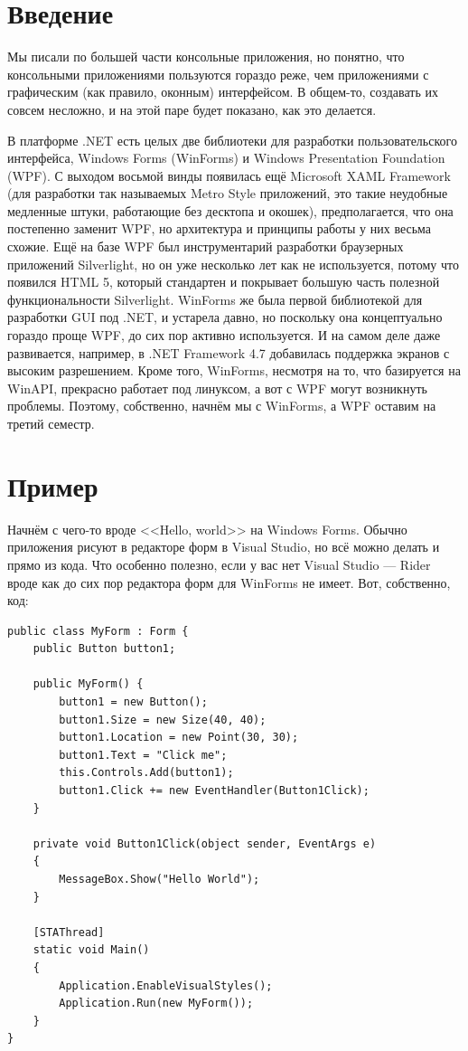 \documentclass{../../text-style}
\begin{document}
\maketitle
\thispagestyle{empty}

\section{Введение}

Мы писали по большей части консольные приложения, но понятно, что консольными приложениями пользуются гораздо реже, чем приложениями с графическим (как правило, оконным) интерфейсом. В общем-то, создавать их совсем несложно, и на этой паре будет показано, как это делается. 

В платформе .NET есть целых две библиотеки для разработки пользовательского интерфейса, Windows Forms (WinForms) и Windows Presentation Foundation (WPF). С выходом восьмой винды появилась ещё Microsoft XAML Framework (для разработки так называемых Metro Style приложений, это такие неудобные медленные штуки, работающие без десктопа и окошек), предполагается, что она постепенно заменит WPF, но архитектура и принципы работы у них весьма схожие. Ещё на базе WPF был инструментарий разработки браузерных приложений Silverlight, но он уже несколько лет как не используется, потому что появился HTML 5, который стандартен и покрывает большую часть полезной функциональности Silverlight. WinForms же была первой библиотекой для разработки GUI под .NET, и устарела давно, но поскольку она концептуально гораздо проще WPF, до сих пор активно используется. И на самом деле даже развивается, например, в .NET Framework 4.7 добавилась поддержка экранов с высоким разрешением. Кроме того, WinForms, несмотря на то, что базируется на WinAPI, прекрасно работает под линуксом, а вот с WPF могут возникнуть проблемы. Поэтому, собственно, начнём мы с WinForms, а WPF оставим на третий семестр.

\section{Пример}

Начнём с чего-то вроде <<Hello, world>> на Windows Forms. Обычно приложения рисуют в редакторе форм в Visual Studio, но всё можно делать и прямо из кода. Что особенно полезно, если у вас нет Visual Studio --- Rider вроде как до сих пор редактора форм для WinForms не имеет. Вот, собственно, код:

\begin{verbatim}
public class MyForm : Form {
    public Button button1;

    public MyForm() {
        button1 = new Button();
        button1.Size = new Size(40, 40);
        button1.Location = new Point(30, 30);
        button1.Text = "Click me";
        this.Controls.Add(button1);
        button1.Click += new EventHandler(Button1Click);
    }

    private void Button1Click(object sender, EventArgs e)
    {
        MessageBox.Show("Hello World");
    }

    [STAThread]
    static void Main()
    {
        Application.EnableVisualStyles();
        Application.Run(new MyForm());
    }
}
\end{verbatim}
\end{document}
